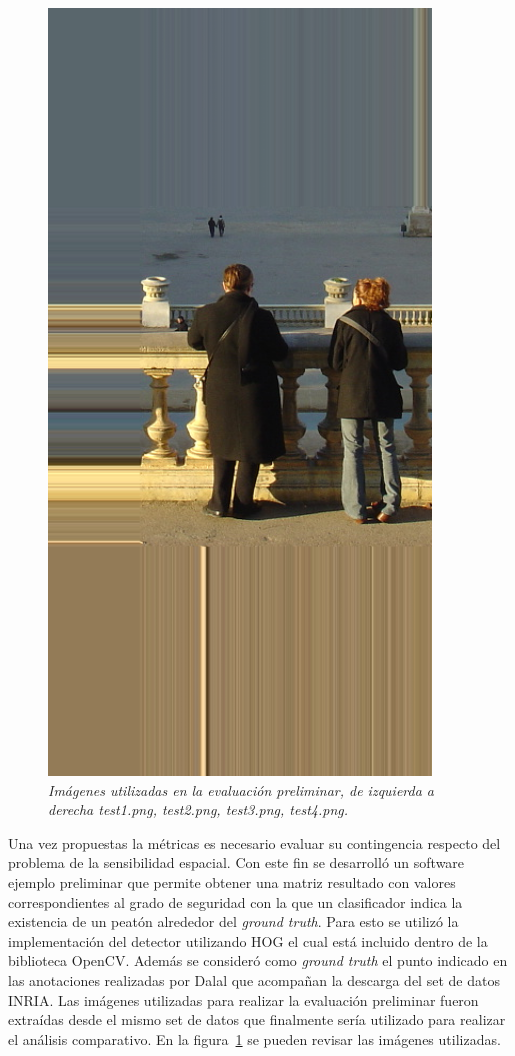 \begin{figure}[H]
  \includegraphics[scale=.25]{images/test4}
  \caption{\em Imágenes utilizadas en la evaluación preliminar, de izquierda a derecha test1.png, test2.png, test3.png, test4.png.}  
  \label{fig:testpersons}
\end{figure}

Una vez propuestas la métricas es necesario evaluar su contingencia respecto del problema de la sensibilidad espacial. Con este fin se desarrolló un software ejemplo preliminar que permite obtener una matriz resultado con valores correspondientes al grado de seguridad con la que un clasificador indica la existencia de un peatón alrededor del \textit{ground truth}. Para  esto se utilizó la implementación del detector utilizando HOG el cual está incluido dentro de la biblioteca OpenCV. Además se consideró como \textit{ground truth} el punto indicado en las anotaciones realizadas por Dalal que acompañan la descarga del set de datos INRIA. 
Las imágenes utilizadas para realizar la evaluación preliminar fueron extraídas desde el mismo set de datos que finalmente sería utilizado para realizar el análisis comparativo. En la figura~\ref{fig:testpersons} se pueden revisar las imágenes utilizadas.

